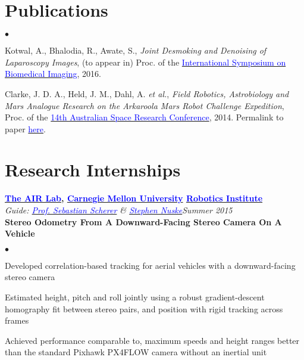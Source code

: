 \documentclass[margin,line]{res}
\newenvironment{list2}{
  \begin{list}{$\bullet$}{%
      \setlength{\itemsep}{0in}
      \setlength{\parsep}{0in} \setlength{\parskip}{0in}
      \setlength{\topsep}{0in} \setlength{\partopsep}{0in} 
      \setlength{\leftmargin}{0.2in}}}{\end{list}}
\begin{document}
\begin{resume}
\vspace*{-0.13in}

\section{\sc Publications}
\begin{list2}
\item Kotwal, A., Bhalodia, R., Awate, S., {\em Joint Desmoking and Denoising of Laparoscopy Images}, (to appear in) Proc. of the \href{http://biomedicalimaging.org/2016/}{\textcolor{blue} {International Symposium on Biomedical Imaging}}, 2016. %
\item Clarke, J. D. A., Held, J. M., Dahl, A. {\em et al.}, {\em Field Robotics, Astrobiology and Mars Analogue Research on the Arkaroola Mars Robot Challenge Expedition}, Proc. of the \href{http://www.nssa.com.au/14asrc/14ASRC-proceedings.zip}{\textcolor{blue} {14th Australian Space Research Conference}}, 2014. Permalink to paper \href{http://alankarkotwal.github.io/pubs/Arkaroola.pdf}{\textcolor{blue} {here}}.
\end{list2}

\vspace*{-0.13in}

\section{\sc Research Internships} 

{\bf  \href{http://theairlab.org/}{\textcolor{blue}{The AIR Lab}}, \href{http://www.cmu.edu/}{\textcolor{blue}{Carnegie Mellon University}} \href{http://ri.cmu.edu/}{\textcolor{blue}{Robotics Institute}}} \\
{\em Guide: \href{http://www.ri.cmu.edu/person.html?person_id=1397}{\textcolor{blue}{Prof. Sebastian Scherer}} \& \href{http://www.ri.cmu.edu/person.html?person_id=2128}{\textcolor{blue} {Stephen Nuske}}}\hfill\textit{Summer 2015} \\
\vspace*{-.13in}
\textbf{Stereo Odometry From A Downward-Facing Stereo Camera On A Vehicle} \\
\vspace*{-.01in}
\begin{list2}
\item Developed correlation-based tracking for aerial vehicles with a downward-facing stereo camera
\item Estimated height, pitch and roll jointly using a robust gradient-descent homography fit between stereo pairs, and position with rigid tracking across frames
\item Achieved performance comparable to, maximum speeds and height ranges better than the standard Pixhawk PX4FLOW camera without an inertial unit
\end{list2}


\end{resume}
\end{document}
